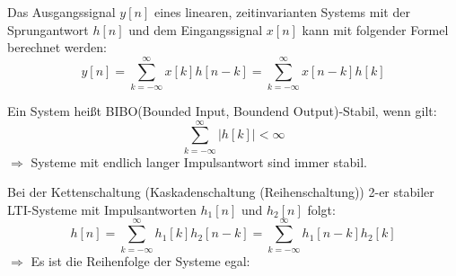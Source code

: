 \begin{uebsp}
\begin{Answer}
    \begin{uebsp_theory}
        Das Ausgangssignal $y[n]$ eines linearen, zeitinvarianten Systems mit der Sprungantwort $h[n]$ und dem Eingangssignal $x[n]$ kann mit folgender Formel berechnet werden:
        \[y[n]=\sum_{k=-\infty}^\infty x[k]h[n-k]=\sum_{k=-\infty}^\infty x[n-k]h[k]\]
    \end{uebsp_theory}
    \begin{uebsp_theory}
        Ein System heißt BIBO(Bounded Input, Boundend Output)-Stabil, wenn gilt:
        \[\sum_{k=-\infty}^\infty\left|h[k]\right|<\infty\]
        $\Rightarrow$ Systeme mit endlich langer Impulsantwort sind immer stabil.
    \end{uebsp_theory}
    \begin{uebsp_theory}
        Bei der Kettenschaltung (Kaskadenschaltung (Reihenschaltung)) 2-er
        stabiler LTI-Systeme mit Impulsantworten $h_1[n]$ und $h_2[n]$ folgt:
        \[h[n]=\sum_{k=-\infty}^\infty h_1[k]h_2[n-k]=\sum_{k=-\infty}^\infty h_1[n-k]h_2[k]\]
        $\Rightarrow$ Es ist die Reihenfolge der Systeme egal:
        \begin{center}
\end{center}
\end{uebsp_theory}
\end{Answer}
\end{uebsp}
